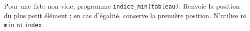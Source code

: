 Pour une liste non vide, programme \texttt{indice\_min(tableau)}. Renvoie la position du plus petit élément ; en cas d'égalité, conserve la première position. N'utilise ni \texttt{min} ni \texttt{index}.
